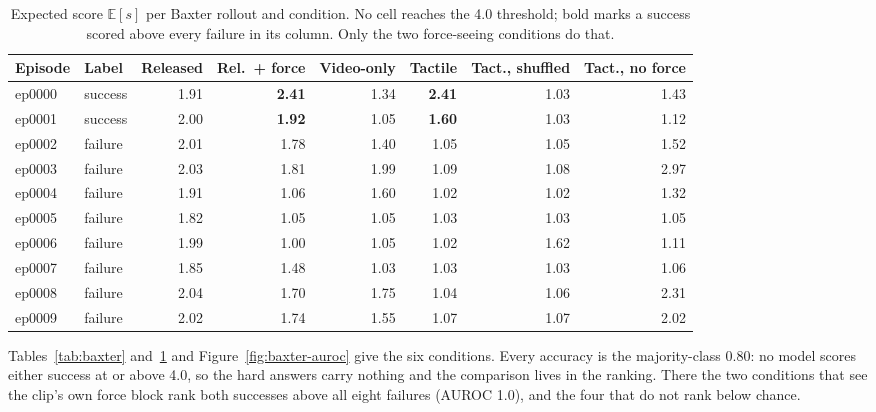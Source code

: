 \documentclass{article}
\newcommand{\Es}{\ensuremath{\mathbb{E}[s]}}
\begin{document}
\begin{table}[t]
  \caption{Expected score \Es{} per Baxter rollout and condition. No cell reaches the 4.0
  threshold; bold marks a success scored above every failure in its column. Only the two
  force-seeing conditions do that.}
  \label{tab:baxter-eps}
  \centering
  \footnotesize
  \begin{tabular}{llrrrrrr}
    \toprule
    Episode & Label & Released & Rel.\ + force & Video-only & Tactile & Tact., shuffled & Tact., no force \\
    \midrule
    ep0000 & success & 1.91 & \textbf{2.41} & 1.34 & \textbf{2.41} & 1.03 & 1.43 \\
    ep0001 & success & 2.00 & \textbf{1.92} & 1.05 & \textbf{1.60} & 1.03 & 1.12 \\
    ep0002 & failure & 2.01 & 1.78 & 1.40 & 1.05 & 1.05 & 1.52 \\
    ep0003 & failure & 2.03 & 1.81 & 1.99 & 1.09 & 1.08 & 2.97 \\
    ep0004 & failure & 1.91 & 1.06 & 1.60 & 1.02 & 1.02 & 1.32 \\
    ep0005 & failure & 1.82 & 1.05 & 1.05 & 1.03 & 1.03 & 1.05 \\
    ep0006 & failure & 1.99 & 1.00 & 1.05 & 1.02 & 1.62 & 1.11 \\
    ep0007 & failure & 1.85 & 1.48 & 1.03 & 1.03 & 1.03 & 1.06 \\
    ep0008 & failure & 2.04 & 1.70 & 1.75 & 1.04 & 1.06 & 2.31 \\
    ep0009 & failure & 2.02 & 1.74 & 1.55 & 1.07 & 1.07 & 2.02 \\
    \bottomrule
  \end{tabular}
\end{table}

Tables~\ref{tab:baxter} and~\ref{tab:baxter-eps} and Figure~\ref{fig:baxter-auroc} give the six
conditions. Every accuracy is the
majority-class 0.80: no model scores either success at or above 4.0, so the hard answers carry
nothing and the comparison lives in the ranking. There the two conditions that see the clip's own
force block rank both successes above all eight failures (AUROC 1.0), and the four that do not
rank below chance.
\end{document}
